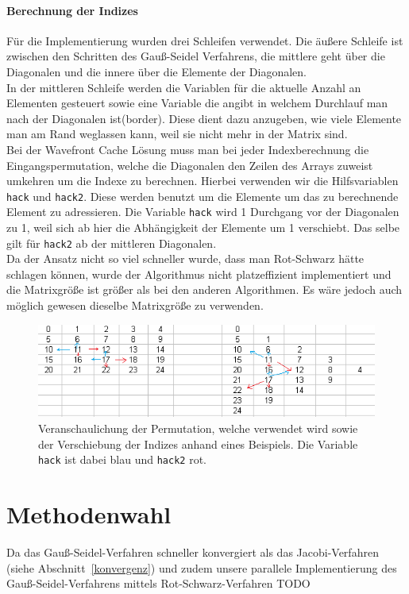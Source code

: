 \documentclass{article}
\begin{document}
\paragraph{Berechnung der Indizes}
Für die Implementierung wurden drei Schleifen verwendet. Die äußere Schleife ist zwischen den Schritten des Gauß-Seidel Verfahrens, die mittlere geht über die Diagonalen und die innere über die Elemente der Diagonalen. \\
In der mittleren Schleife werden die Variablen für die aktuelle Anzahl an Elementen gesteuert sowie eine Variable die angibt in welchem Durchlauf man nach der Diagonalen ist(border). Diese dient dazu anzugeben, wie viele Elemente man am Rand weglassen kann, weil sie nicht mehr in der Matrix sind.\\
Bei der Wavefront Cache Lösung muss man bei jeder Indexberechnung die Eingangspermutation, welche die Diagonalen den Zeilen des Arrays zuweist umkehren um die Indexe zu berechnen. Hierbei verwenden wir die Hilfsvariablen \texttt{hack} und \texttt{hack2}. Diese werden benutzt um die Elemente um das zu berechnende Element zu adressieren. Die Variable \texttt{hack} wird 1 Durchgang vor der Diagonalen zu 1, weil sich ab hier die Abhängigkeit der Elemente um 1 verschiebt. Das selbe gilt für \texttt{hack2} ab der mittleren Diagonalen. \\
Da der Ansatz nicht so viel schneller wurde, dass man Rot-Schwarz hätte schlagen können, wurde der Algorithmus nicht platzeffizient implementiert und die Matrixgröße ist größer als bei den anderen Algorithmen. Es wäre jedoch auch möglich gewesen dieselbe Matrixgröße zu verwenden.

\begin{figure}[htbp] 
  \centering
     \includegraphics[width=1\textwidth]{bilder/hack.png}
  \caption{Veranschaulichung der Permutation, welche verwendet wird sowie der Verschiebung der Indizes anhand eines Beispiels. Die Variable \texttt{hack} ist dabei blau und \texttt{hack2} rot.}
  \label{fig:Bild6}
\end{figure}

\section{Methodenwahl}
Da das Gauß-Seidel-Verfahren schneller konvergiert als das Jacobi-Verfahren (siehe Abschnitt~\ref{konvergenz}) und zudem unsere parallele Implementierung des Gauß-Seidel-Verfahrens mittels Rot-Schwarz-Verfahren TODO
\end{document}
